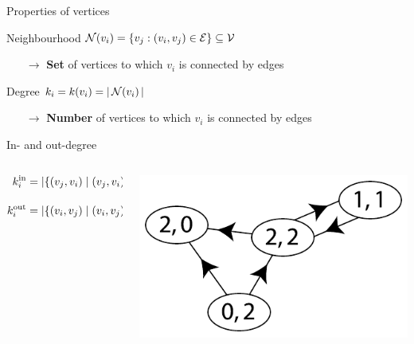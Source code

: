 \begin{frame}{Properties of vertices}
    \begin{block}{Neighbourhood}
        \centering
        $\mathcal{N}(v_{i}) = \left\{ v_{j} : (v_{i}, v_{j}) \in \mathcal{E} \right\} \subseteq \mathcal{V}$
        \begin{itemize}
            \item[$\rightarrow$] \textbf{Set} of vertices to which $v_{i}$ is
                                 connected by edges
        \end{itemize}
    \end{block}
    \vfill
    \begin{block}{Degree}
        \centering
        $k_{i} = k(v_{i}) = \left| \, \mathcal{N}(v_{i}) \, \right|$
        \begin{itemize}
            \item[$\rightarrow$] \textbf{Number} of vertices to which $v_{i}$ is
                                 connected by edges
        \end{itemize}
    \end{block}
\end{frame}

\begin{frame}{In- and out-degree}
    \begin{columns}
        \begin{column}{0.5\textwidth}
            \begin{align*}
                k^{\text{in}}_{i} &= \left| \left\{ \left( v_{j}, v_{i} \right)\;\middle|\;\left( v_{j}, v_{i} \right) \in \mathcal{E} \right\} \right| \\[1em]
                k^{\text{out}}_{i} &= \left| \left\{ \left( v_{i}, v_{j} \right)\;\middle|\;\left( v_{i}, v_{j} \right) \in \mathcal{E} \right\} \right|
            \end{align*}
        \end{column}
        \begin{column}{0.5\textwidth}
            \begin{center}
                \includegraphics[width=\textwidth]{figures/degree}
            \end{center}
        \end{column}
    \end{columns}
\end{frame}

